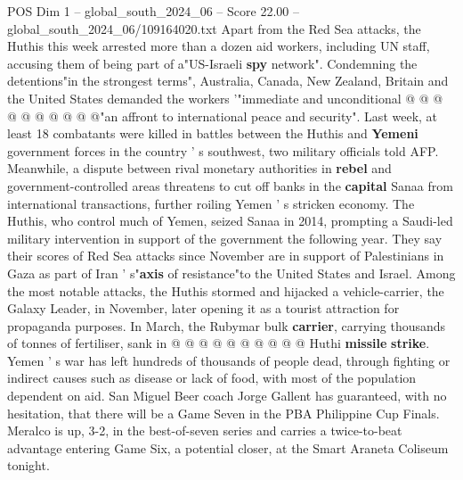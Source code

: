 \begin{textsample}{POS Dim 1 – global\_south\_2024\_06 – Score 22.00 – global\_south\_2024\_06/109164020.txt}
Apart from the Red Sea attacks, the Huthis this week arrested more than a dozen aid workers, including UN staff, accusing them of being part of a"US-Israeli \textbf{spy} network".
Condemning the detentions"in the strongest terms", Australia, Canada, New Zealand, Britain and the United States demanded the workers '"immediate and unconditional @ @ @ @ @ @ @ @ @ @"an affront to international peace and security".
Last week, at least 18 combatants were killed in battles between the Huthis and \textbf{Yemeni} government forces in the country ' s southwest, two military officials told AFP.
Meanwhile, a dispute between rival monetary authorities in \textbf{rebel} and government-controlled areas threatens to cut off banks in the \textbf{capital} Sanaa from international transactions, further roiling Yemen ' s stricken economy.
The Huthis, who control much of Yemen, seized Sanaa in 2014, prompting a Saudi-led military intervention in support of the government the following year.
They say their scores of Red Sea attacks since November are in support of Palestinians in Gaza as part of Iran ' s"\textbf{axis} of resistance"to the United States and Israel.
Among the most notable attacks, the Huthis stormed and hijacked a vehicle-carrier, the Galaxy Leader, in November, later opening it as a tourist attraction for propaganda purposes.
In March, the Rubymar bulk \textbf{carrier}, carrying thousands of tonnes of fertiliser, sank in @ @ @ @ @ @ @ @ @ @ Huthi \textbf{missile} \textbf{strike}.
Yemen ' s war has left hundreds of thousands of people dead, through fighting or indirect causes such as disease or lack of food, with most of the population dependent on aid.
San Miguel Beer coach Jorge Gallent has guaranteed, with no hesitation, that there will be a Game Seven in the PBA Philippine Cup Finals.
Meralco is up, 3-2, in the best-of-seven series and carries a twice-to-beat advantage entering Game Six, a potential closer, at the Smart Araneta Coliseum tonight.

\end{textsample}
